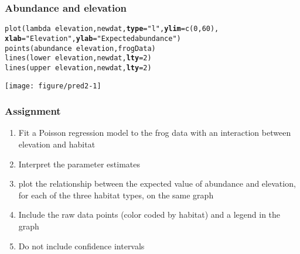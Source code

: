 \documentclass[color=usenames,dvipsnames]{beamer}\usepackage[]{graphicx}\usepackage[]{color}
\makeatletter
\newcommand{\hlnum}[1]{\textcolor[rgb]{0.69,0.494,0}{#1}}%
\newcommand{\hlstr}[1]{\textcolor[rgb]{0.749,0.012,0.012}{#1}}%
\newcommand{\hlopt}[1]{\textcolor[rgb]{0,0,0}{#1}}%
\newcommand{\hlstd}[1]{\textcolor[rgb]{0,0,0}{#1}}%
\newcommand{\hlkwc}[1]{\textcolor[rgb]{0,0,0}{\textbf{#1}}}%
\newcommand{\hlkwd}[1]{\textcolor[rgb]{0.004,0.004,0.506}{#1}}%
\newenvironment{kframe}{%
 \def\at@end@of@kframe{}%
 \ifinner\ifhmode%
  \def\at@end@of@kframe{\end{minipage}}%
  \begin{minipage}{\columnwidth}%
 \fi\fi%
 \def\FrameCommand##1{\hskip\@totalleftmargin \hskip-\fboxsep
 \colorbox{shadecolor}{##1}\hskip-\fboxsep
     \hskip-\linewidth \hskip-\@totalleftmargin \hskip\columnwidth}%
 \MakeFramed {\advance\hsize-\width
   \@totalleftmargin\z@ \linewidth\hsize
   \@setminipage}}%
 {\par\unskip\endMakeFramed%
 \at@end@of@kframe}
\newenvironment{knitrout}{}{} %
\makeatother
\begin{document}
\begin{frame}[fragile]
  \frametitle{Abundance and elevation}
  \tiny
\begin{knitrout}\tiny
{}\color{fgcolor}\begin{kframe}
\begin{alltt}
\hlkwd{plot}\hlstd{(lambda} \hlopt{~} \hlstd{elevation, newdat,} \hlkwc{type}\hlstd{=}\hlstr{"l"}\hlstd{,} \hlkwc{ylim}\hlstd{=}\hlkwd{c}\hlstd{(}\hlnum{0}\hlstd{,}\hlnum{60}\hlstd{),}
     \hlkwc{xlab}\hlstd{=}\hlstr{"Elevation"}\hlstd{,} \hlkwc{ylab}\hlstd{=}\hlstr{"Expected abundance"}\hlstd{)}
\hlkwd{points}\hlstd{(abundance} \hlopt{~} \hlstd{elevation, frogData)}
\hlkwd{lines}\hlstd{(lower} \hlopt{~} \hlstd{elevation, newdat,} \hlkwc{lty}\hlstd{=}\hlnum{2}\hlstd{)}
\hlkwd{lines}\hlstd{(upper} \hlopt{~} \hlstd{elevation, newdat,} \hlkwc{lty}\hlstd{=}\hlnum{2}\hlstd{)}
\end{alltt}
\end{kframe}
\end{knitrout}
\centering
\texttt{[image: figure/pred2-1]} \\
\end{frame}













\begin{frame}
  \frametitle{Assignment}
  \begin{enumerate}[\bf (1)]
    \item Fit a Poisson regression model to the frog data with an
      interaction between elevation and habitat
    \item Interpret the parameter estimates
    \item plot the relationship between the expected value of abundance and
      elevation, for each of the three habitat types, on the same graph
    \item Include the raw data points (color coded by habitat) and a legend in
      the graph
    \item Do not include confidence intervals
  \end{enumerate}
\end{frame}
\end{document}
